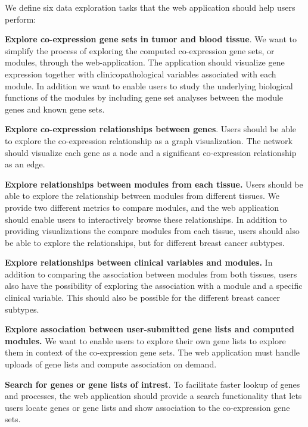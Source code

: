 We define six data exploration tasks that the web application should help users
perform: 

\textbf{Explore co-expression gene sets in tumor and blood tissue}. We want to
simplify the process of exploring the computed co-expression gene sets, or
modules, through the web-application. The application should 
visualize gene expression together with clinicopathological variables associated
with each module. In addition we want to enable users to study the underlying
biological functions of the modules by including gene set analyses between the
module genes and known gene sets. 

\textbf{Explore co-expression relationships between genes}. Users should be able
to explore the co-expression relationship as a graph visualization. The network
should visualize each gene as a node and a significant co-expression
relationship as an edge.  

\textbf{Explore relationships between modules from each tissue.} Users should be
able to explore the relationship between modules from different tissues. We
provide two different metrics to compare modules, and the web application should
enable users to interactively browse these relationships. In addition to
providing visualizations the compare modules from each tissue, users should also
be able to explore the relationships, but for different breast cancer subtypes. 

\textbf{Explore relationships between clinical variables and modules.} In
addition to comparing the association between modules from both tissues, users
also have the possibility of exploring the association with a module and a
specific clinical variable. This should also be possible for the different
breast cancer subtypes. 

\textbf{Explore association between user-submitted gene lists and computed
modules.} We want to enable users to explore their own gene lists to explore
them in context of
the co-expression gene sets. The web application must handle uploads of gene
lists and compute association on demand. 

\textbf{Search for genes or gene lists of intrest}. To facilitate faster lookup
of genes and processes, the web application should provide a search
functionality that lets users locate genes or gene lists and show association to
the co-expression gene sets. 

